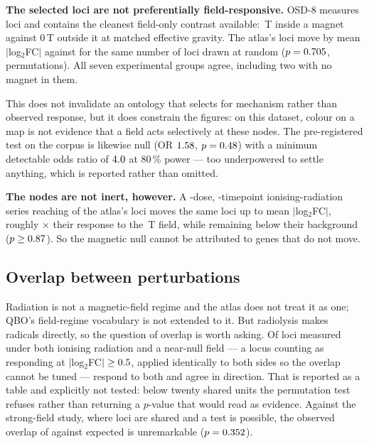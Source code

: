 \documentclass[11pt,a4paper]{article}
\begin{document}
\textbf{The selected loci are not preferentially field-responsive.} OSD-8 measures
\OsdEightLoci{} loci and contains the cleanest field-only contrast available:
\OsdEightTesla\,T inside a magnet against $0$\,T outside it at matched effective gravity.
The atlas's loci move by mean $|$log$_2$FC$|$ \OsdEightObs{} against \OsdEightBg{} for
the same number of loci drawn at random ($p=0.705$, \OsdEightPerms{} permutations).
All seven experimental groups agree, including two with no magnet in them.

This does not invalidate an ontology that selects for mechanism rather than observed
response, but it does constrain the figures: on this dataset, colour on a map is not
evidence that a field acts selectively at these nodes. The pre-registered test on the
corpus is likewise null (OR $1.58$, $p=0.48$) with a minimum detectable odds
ratio of $4.0$ at 80\,\% power --- too underpowered to settle anything, which is
reported rather than omitted.

\textbf{The nodes are not inert, however.} A \RadDoses{}-dose,
\RadTimepoints{}-timepoint ionising-radiation series reaching \RadLoci{} of the atlas's
loci moves the same loci up
to \RadMaxObs{} mean $|$log$_2$FC$|$, roughly \RadVsMagnetFold$\times$ their response to
the \OsdEightTesla\,T field, while remaining below their background ($p \ge 0.87$).
So the magnetic null cannot be attributed to genes that do not move.

\subsection{Overlap between perturbations}

Radiation is not a magnetic-field regime and the atlas does not treat it as one; QBO's
field-regime vocabulary is not extended to it. But radiolysis makes radicals directly,
so the question of overlap is worth asking. Of \OverlapNnmfN{} loci measured under both
ionising radiation and a near-null field --- a locus counting as responding at
$|$log$_2$FC$| \ge 0.5$, applied identically to both sides so the overlap
cannot be tuned --- \OverlapNnmfShared{} respond to both and
\OverlapNnmfAgree{} agree in direction. That is reported as a table and explicitly not
tested: below twenty shared units the permutation test refuses rather than returning a
$p$-value that would read as evidence. Against the strong-field study, where
\OverlapStrongN{} loci are shared and a test is possible, the observed overlap of
\OverlapStrongObs{} against \OverlapStrongExp{} expected is unremarkable
($p=0.352$).
\end{document}
